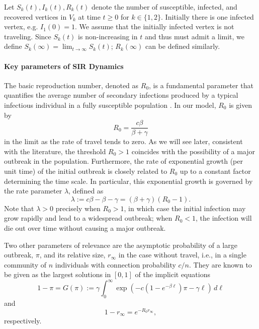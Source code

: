 \documentclass[11pt]{article}
\begin{document}
Let $S_k(t), I_k(t), R_k(t)$ denote the number of susceptible, infected, and recovered vertices in $V_k$ at time $t \ge 0$ for $k \in \{1, 2\}$. Initially there is one infected vertex, e.g. $I_1(0) = 1$. We assume that the initially infected vertex is not traveling. Since $S_k(t)$ is non-increasing in $t$ and thus must admit a limit, we define $S_k(\infty) = \lim_{t\to\infty} S_k(t)$; $R_k(\infty)$ can be defined similarly.

\paragraph{Key parameters of SIR Dynamics}
The basic reproduction number, denoted as $R_0$, is a fundamental parameter that quantifies the average number of secondary infections produced by a typical infectious individual in a fully susceptible population \cite{diekmann1990definition}.  In our model, $R_0$ is given by
\begin{equation}\label{eqn_R0_def}
    R_0 = \frac{c\beta }{ \beta + \gamma}
\end{equation}
in the limit as the rate of travel tends to zero.
As we will see later, consistent with the literature, the threshold $R_0 > 1$ coincides with the possibility of a major outbreak in the population. Furthermore, the rate of exponential growth (per unit time) of the initial outbreak is closely related to $R_0$ up to a constant factor determining the time scale. In particular, this exponential growth is governed by the rate parameter $\lambda$, defined as 
\begin{equation}\label{eqn_lambda_def}
    \lambda := c\beta - \beta - \gamma = (\beta + \gamma)(R_0 -1).
\end{equation}
Note that $\lambda > 0$ precisely when $R_0 > 1$, in which case the initial infection may grow rapidly and lead to a widespread outbreak; when $R_0 < 1 $, the infection will die out over time without causing a major outbreak.

Two other parameters of relevance are the asymptotic probability
of a large outbreak, $\pi$,  and its relative size, $r_\infty$ 
in the case without travel, i.e., in a single community of $n$ individuals with connection probability $c/n$. They are known to be given as the largest solutions in $[0,1]$ of the implicit equations
 \begin{equation}\label{eqn_theta_def}
        1-\pi = G(\pi) := \gamma \int_0^\infty \exp(-c(1-e^{-\beta \ell})\pi - \gamma \ell) \,d\ell
    \end{equation}
    and
    \begin{equation}\label{eqn_r_infty}
        1 - r_\infty = e^{-R_0 r_\infty},
    \end{equation}
respectively.
\end{document}
